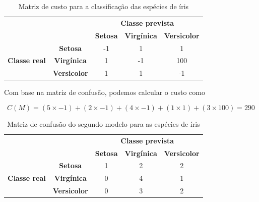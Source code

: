 \begin{table}[h]
	\centering
	
	\begin{tabular}{cc|c|c|c|}
		\cline{3-5}
		&                     & \multicolumn{3}{c|}{\textbf{Classe prevista}}              \\ \cline{3-5} 
		&                     & \textbf{Setosa} & \textbf{Virgínica} & \textbf{Versicolor} \\ \hline
		\multicolumn{1}{|c|}{\multirow{3}{*}{\textbf{Classe real}}} & \textbf{Setosa}     & -1              & 1                  & 1                   \\ \cline{2-5} 
		\multicolumn{1}{|c|}{}                                      & \textbf{Virgínica}  & 1               & -1                 & 100                 \\ \cline{2-5} 
		\multicolumn{1}{|c|}{}                                      & \textbf{Versicolor} & 1               & 1                  & -1                  \\ \hline
	\end{tabular}
	
	\caption{Matriz de custo para a classificação das espécies de íris}
	\label{tab:matriz-custo-iris}
\end{table}

Com base na matriz de confusão, podemos calcular o custo como

$$
C(M) = (5 \times -1) + (2 \times -1) + (4 \times -1) + (1 \times 1) + (3 \times 100) = 290
$$

\begin{table}[h]
	\centering
	
	\begin{tabular}{cc|c|c|c|}
		\cline{3-5}
		&                     & \multicolumn{3}{c|}{\textbf{Classe prevista}}              \\ \cline{3-5} 
		&                     & \textbf{Setosa} & \textbf{Virgínica} & \textbf{Versicolor} \\ \hline
		\multicolumn{1}{|c|}{\multirow{3}{*}{\textbf{Classe real}}} & \textbf{Setosa}     & 1               & 2                  & 2                   \\ \cline{2-5} 
		\multicolumn{1}{|c|}{}                                      & \textbf{Virgínica}  & 0               & 4                  & 1                   \\ \cline{2-5} 
		\multicolumn{1}{|c|}{}                                      & \textbf{Versicolor} & 0               & 3                  & 2                   \\ \hline
	\end{tabular}
	
	\caption{Matriz de confusão do segundo modelo para as espécies de íris}
	\label{tab:matriz-confusao-iris-2}
\end{table}

